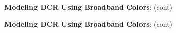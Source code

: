 \documentclass[DM,toc]{lsstdoc}
\begin{document}
\begin{figure}
    \ContinuedFloat
    \centering
    \caption[]{\textbf{Modeling DCR Using Broadband Colors}: (cont)}
    \label{dcrmodel2}
\end{figure}
\begin{figure}
    \ContinuedFloat
    \centering
    \caption[]{\textbf{Modeling DCR Using Broadband Colors}: (cont)}
    \label{dcrmodel2}
\end{figure}
\clearpage
\end{document}
